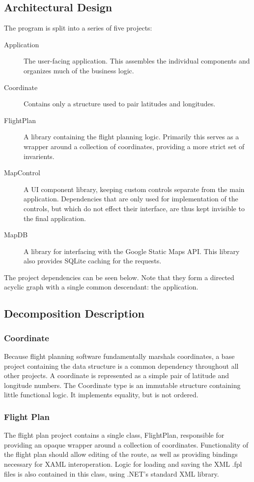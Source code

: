 \documentclass[12pt, letterpaper]{article}
\begin{document}
\newpage
\subsection{Architectural Design}
The program is split into a series of five projects:
\begin{description}
  \item[Application] The user-facing application.
    This assembles the individual components and organizes much of the business logic.
  \item[Coordinate] Contains only a structure used to pair latitudes and longitudes.
  \item[FlightPlan] A library containing the flight planning logic.
    Primarily this serves as a wrapper around a collection of coordinates, providing a more strict set of invarients.
  \item[MapControl] A UI component library, keeping custom controls separate from the main application.
    Dependencies that are only used for implementation of the controls, but which do not effect their interface, are thus kept invisible to the final application.
  \item[MapDB] A library for interfacing with the Google Static Maps API.
    This library also provides SQLite caching for the requests.
\end{description}
The project dependencies can be seen below.
Note that they form a directed acyclic graph with a single common descendant: the application.

\subsection{Decomposition Description}
\subsubsection{Coordinate} \label{sec:coord}
Because flight planning software fundamentally marshals coordinates,
a base project containing the data structure is a common dependency throughout all other projects.
A coordinate is represented as a simple pair of latitude and longitude numbers.
The Coordinate type is an immutable structure containing little functional logic.
It implements equality, but is not ordered.

\subsubsection{Flight Plan}\label{sec:plan}
The flight plan project contains a single class, FlightPlan, responsible for providing an opaque wrapper around a collection of coordinates.
Functionality of the flight plan should allow editing of the route, as well as providing bindings necessary for XAML interoperation.
Logic for loading and saving the XML .fpl files is also contained in this class, using .NET's standard XML library.
\end{document}
